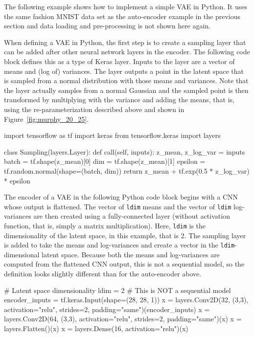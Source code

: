 \begin{withcode}
The following example shows how to implement a simple VAE in Python. It uses the same fashion MNIST data set as the auto-encoder example in the previous section and data loading and pre-processing is not shown here again. 

When defining a VAE in Python, the first step is to create a sampling layer that can be added after other neural network layers in the encoder. The following code block defines this as a type of Keras layer. Inputs to the layer are a vector of means and (log of) variances. The layer outputs a point in the latent space that is sampled from a normal distribution with those means and variances. Note that the layer actually samples from a normal Gaussian and the sampled point is then transformed by multiplying with the variance and adding the means, that is, using the re-parameterization described above and shown in Figure~\ref{fig:murphy_20_25}.

\begin{pythoncode}
import tensorflow as tf
import keras
from tensorflow.keras import layers

class Sampling(layers.Layer):
    def call(self, inputs):
        z_mean, z_log_var = inputs
        batch = tf.shape(z_mean)[0]
        dim = tf.shape(z_mean)[1]
        epsilon = tf.random.normal(shape=(batch, dim))
        return z_mean + tf.exp(0.5 * z_log_var) * epsilon
\end{pythoncode}

The encoder of a VAE in the following Python code block begins with a CNN whose output is flattened. The vector of \texttt{ldim} means and the vector of \texttt{ldim} log-variances are then created using a fully-connected layer (without activation function, that is, simply a matrix multiplication). Here, \texttt{ldim} is the dimensionality of the latent space, in this example, that is 2. The sampling layer is added to take the means and log-variances and create a vector in the \texttt{ldim}-dimensional latent space. Because both the means and log-variances are computed from the flattened CNN output, this is not a sequential model, so the definition looks slightly different than for the auto-encoder above.

\begin{pythoncode}
# Latent space dimensionality
ldim = 2
# This is NOT a sequential model
encoder_inputs = tf.keras.Input(shape=(28, 28, 1))
x = layers.Conv2D(32, (3,3), activation="relu", 
             strides=2, padding="same")(encoder_inputs)
x = layers.Conv2D(64, (3,3), activation="relu", 
             strides=2, padding="same")(x)
x = layers.Flatten()(x)
x = layers.Dense(16, activation="relu")(x)


\end{pythoncode}
\end{withcode}

